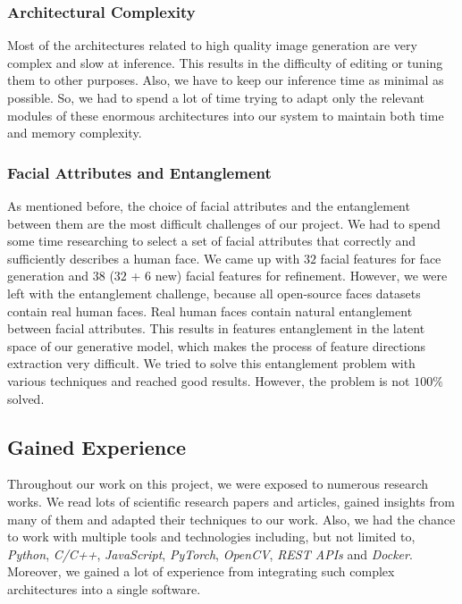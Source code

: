 \subsubsection{Architectural Complexity}
Most of the architectures related to high quality image generation are very complex and slow at inference. This results in the difficulty of editing or tuning them to other purposes. Also, we have to keep our inference time as minimal as possible. So, we had to spend a lot of time trying to adapt only the relevant modules of these enormous architectures into our system to maintain both time and memory complexity.

\subsubsection{Facial Attributes and Entanglement}
As mentioned before, the choice of facial attributes and the entanglement between them are the most difficult challenges of our project. We had to spend some time researching to select a set of facial attributes that correctly and sufficiently describes a human face. We came up with $32$ facial features for face generation and $38$ ($32$ + $6$ new) facial features for refinement. However, we were left with the entanglement challenge, because all open-source faces datasets contain real human faces. Real human faces contain natural entanglement between facial attributes. This results in features entanglement in the latent space of our generative model, which makes the process of feature directions extraction very difficult. We tried to solve this entanglement problem with various techniques and reached good results. However, the problem is not $100\%$ solved.

\subsection{Gained Experience}
Throughout our work on this project, we were exposed to numerous research works. We read lots of scientific research papers and articles, gained insights from many of them and adapted their techniques to our work. Also, we had the chance to work with multiple tools and technologies including, but not limited to, \emph{Python}, \emph{C/C++}, \emph{JavaScript}, \emph{PyTorch}, \emph{OpenCV}, \emph{REST APIs} and \emph{Docker}. Moreover, we gained a lot of experience from integrating such complex architectures into a single software.

